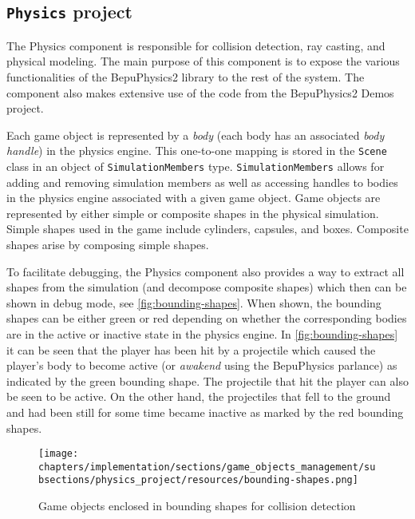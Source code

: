 \subsection{\texttt{Physics} project}
The Physics component is responsible for collision detection, ray casting, and physical modeling.
The main purpose of this component is to expose the various functionalities of the BepuPhysics2 library to the rest of the system.
The component also makes extensive use of the code from the BepuPhysics2 Demos project.

Each game object is represented by a \textit{body} (each body has an associated \textit{body handle}) in the physics engine.
This one-to-one mapping is stored in the \texttt{Scene} class in an object of \texttt{SimulationMembers} type.
\texttt{SimulationMembers} allows for adding and removing simulation members as well as accessing handles to bodies in the physics engine associated with a given game object.
Game objects are represented by either simple or composite shapes in the physical simulation.
Simple shapes used in the game include cylinders, capsules, and boxes.
Composite shapes arise by composing simple shapes.

To facilitate debugging, the Physics component also provides a way to extract all shapes from the simulation (and decompose composite shapes) which then can be shown in debug mode, see \autoref{fig:bounding-shapes}.
When shown, the bounding shapes can be either green or red depending on whether the corresponding bodies are in the active or inactive state in the physics engine.
In \autoref{fig:bounding-shapes} it can be seen that the player has been hit by a projectile which caused the player's body to become active (or \textit{awakend} using the BepuPhysics parlance) as indicated by the green bounding shape.
The projectile that hit the player can also be seen to be active.
On the other hand, the projectiles that fell to the ground and had been still for some time became inactive as marked by the red bounding shapes.
\begin{figure}[h]
    \centering
    \texttt{[image: chapters/implementation/sections/game\_objects\_management/subsections/physics\_project/resources/bounding-shapes.png]}
    \caption{Game objects enclosed in bounding shapes for collision detection}
    \label{fig:bounding-shapes}
\end{figure}

